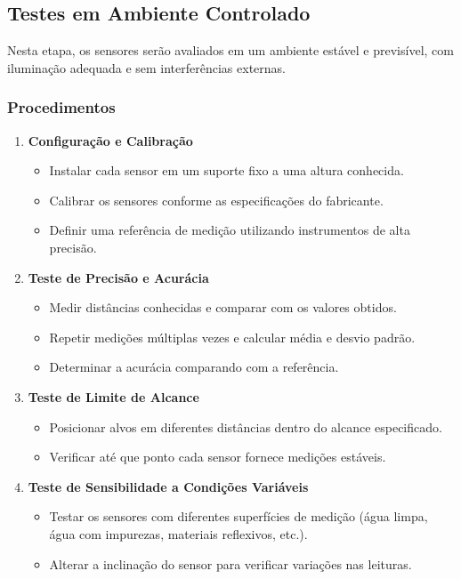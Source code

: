 \subsection{Testes em Ambiente Controlado}
Nesta etapa, os sensores serão avaliados em um ambiente estável e previsível, com iluminação adequada e sem interferências externas.

\subsubsection{Procedimentos}
\begin{enumerate}
    \item \textbf{Configuração e Calibração}
    \begin{itemize}
        \item Instalar cada sensor em um suporte fixo a uma altura conhecida.
        \item Calibrar os sensores conforme as especificações do fabricante.
        \item Definir uma referência de medição utilizando instrumentos de alta precisão.
    \end{itemize}
    \item \textbf{Teste de Precisão e Acurácia}
    \begin{itemize}
        \item Medir distâncias conhecidas e comparar com os valores obtidos.
        \item Repetir medições múltiplas vezes e calcular média e desvio padrão.
        \item Determinar a acurácia comparando com a referência.
    \end{itemize}
    \item \textbf{Teste de Limite de Alcance}
    \begin{itemize}
        \item Posicionar alvos em diferentes distâncias dentro do alcance especificado.
        \item Verificar até que ponto cada sensor fornece medições estáveis.
    \end{itemize}
    \item \textbf{Teste de Sensibilidade a Condições Variáveis}
    \begin{itemize}
        \item Testar os sensores com diferentes superfícies de medição (água limpa, água com impurezas, materiais reflexivos, etc.).
        \item Alterar a inclinação do sensor para verificar variações nas leituras.
    \end{itemize}
\end{enumerate}

